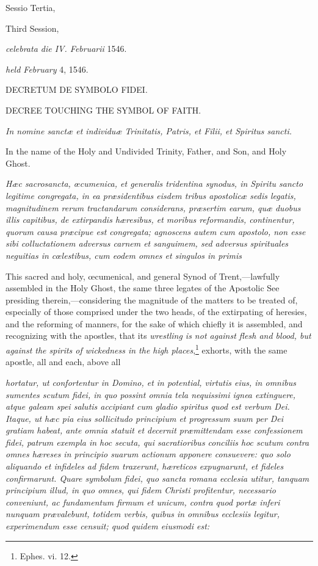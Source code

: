 
Sessio Tertia,

Third Session,

\emph{celebrata die IV. Februarii} 1546.

\emph{held February} 4, 1546.

DECRETUM DE SYMBOLO FIDEI.

DECREE TOUCHING THE SYMBOL OF FAITH.

\emph{In nomine sanctæ et individuæ Trinitatis, Patris, et Filii, et Spiritus sancti.}

In the name of the Holy and Undivided Trinity, Father, and Son, and Holy Ghost.

\emph{Hæc sacrosancta, œcumenica, et generalis tridentina synodus, in Spiritu sancto legitime congregata, in ea præsidentibus eisdem tribus apostolicæ sedis legatis, magnitudinem rerum tractandarum considerans, præsertim earum, quæ duobus illis capitibus, de extirpandis hæresibus, et moribus reformandis, continentur, quorum causa præcipue est congregata; agnoscens autem cum apostolo, non esse sibi colluctationem adversus carnem et sanguimem, sed adversus spirituales neguitias in cœlestibus, cum eodem omnes et singulos in primis}

This sacred and holy, œcumenical, and general Synod of Trent,—lawfully assembled in the Holy Ghost, the same three legates of the Apostolic See presiding therein,—considering the magnitude of the matters to be treated of, especially of those comprised under the two heads, of the extirpating of heresies, and the reforming of manners, for the sake of which chiefly it is assembled, and recognizing with the apostles, that its \emph{wrestling is not against flesh and blood, but against the spirits of wickedness in the high places},\footnote{\par   Ephes. vi. 12.} exhorts, with the same apostle, all and each, above all

\emph{hortatur, ut confortentur in Domino, et in potential, virtutis eius, in omnibus sumentes scutum fidei, in quo possint omnia tela nequissimi ignea extinguere, atque galeam spei salutis accipiant cum gladio spiritus quod est verbum Dei. Itaque, ut hæc pia eius sollicitudo principium et progressum suum per Dei gratiam habeat, ante omnia statuit et decernit præmittendam esse confessionem fidei, patrum exempla in hoc secuta, qui sacratioribus conciliis hoc scutum contra omnes hæreses in principio suarum actionum apponere consuevere: quo solo aliquando et infideles ad fidem traxerunt, hæreticos expugnarunt, et fideles confirmarunt. Quare symbolum fidei, quo sancta romana ecclesia utitur, tanquam principium illud, in quo omnes, qui fidem Christi profitentur, necessario conveniunt, ac fundamentum firmum et unicum, contra quod portæ inferi nunquam prævalebunt, totidem verbis, quibus in omnibus ecclesiis legitur, experimendum esse censuit; quod quidem eiusmodi est:}


